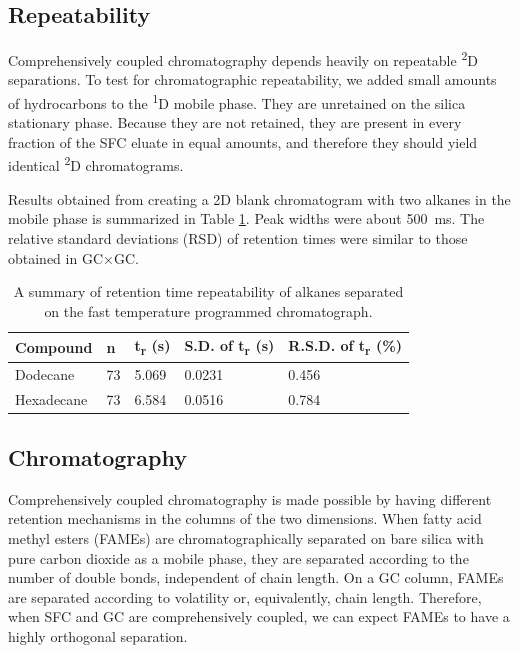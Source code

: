 \documentclass[aip,rsi,preprint,graphicx]{revtex4-1} %
\begin{document}
\subsection{Repeatability}

Comprehensively coupled chromatography depends heavily on repeatable
\textsuperscript{2}D separations. To test for chromatographic repeatability, we
added small amounts of hydrocarbons to the \textsuperscript{1}D mobile phase.
They are unretained on the silica stationary phase. Because they are not
retained, they are present in every fraction of the SFC eluate in equal amounts,
and therefore they should yield identical \textsuperscript{2}D chromatograms.

Results obtained from creating a 2D blank chromatogram with two alkanes in the
mobile phase is summarized in Table \ref{tab:table1}. Peak widths were about
\SI{500}{\milli\second}. The relative standard deviations (RSD) of retention
times were similar to those obtained in GC×GC\cite{Shellie2002}.

\begin{table}

\caption{\label{tab:table1}A summary of retention time repeatability of alkanes
separated on the fast temperature programmed chromatograph.}

\begin{ruledtabular}
\begin{tabular}{lllll}
Compound & n & t\textsubscript{r} (s) & S.D. of t\textsubscript{r} (s)& R.S.D. of t\textsubscript{r} (\%)\\
\hline
Dodecane & 73 & 5.069 & 0.0231 & 0.456\\
Hexadecane & 73 & 6.584 & 0.0516 & 0.784\\
\end{tabular}
\end{ruledtabular}
\end{table}

\subsection{Chromatography}

Comprehensively coupled chromatography is made possible by having different
retention mechanisms in the columns of the two dimensions. When fatty acid
methyl esters (FAMEs) are chromatographically separated on bare silica with pure
carbon dioxide as a mobile phase, they are separated according to the number of
double bonds, independent of chain length\cite{Smith2001}. On a GC column, FAMEs
are separated according to volatility or, equivalently, chain length. Therefore,
when SFC and GC are comprehensively coupled, we can expect FAMEs to have a
highly orthogonal separation.
\end{document}
